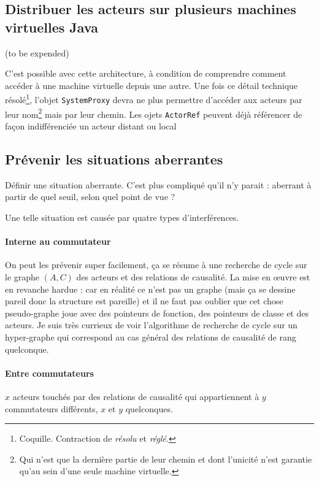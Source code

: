 \documentclass[11pt]{article}
\begin{document}
\subsection{Distribuer les acteurs sur plusieurs machines virtuelles Java}

(to be expended)

C'est possible avec cette architecture, à condition de comprendre comment accéder à une machine virtuelle depuis une autre. Une fois ce détail technique résolé\footnote{Coquille. Contraction de \textsl{résolu} et \textsl{réglé}.}, l'objet \texttt{SystemProxy} devra ne plus permettre d'accéder aux acteurs par leur nom\footnote{Qui n'est que la dernière partie de leur chemin et dont l'unicité n'est garantie qu'au sein d'une seule machine virtuelle.} mais par leur chemin. Les ojets \texttt{ActorRef} peuvent déjà référencer de façon indifférenciée un acteur distant ou local

\subsection{Prévenir les situations aberrantes}

Définir une situation aberrante. C'est plus compliqué qu'il n'y parait : aberrant à partir de quel seuil, selon quel point de vue ?

Une telle situation est causée par quatre types d'interférences.

\paragraph{Interne au commutateur} On peut les prévenir super facilement, ça se résume à une recherche de cycle sur le graphe $(A, C)$ des acteurs et des relations de causalité. La mise en œuvre est en revanche hardue : car en réalité ce n'est pas un graphe (mais ça se dessine pareil donc la structure est pareille) et il ne faut pas oublier que cet chose pseudo-graphe joue avec des pointeurs de fonction, des pointeurs de classe et des acteurs. Je suis très currieux de voir l'algorithme de recherche de cycle sur un hyper-graphe qui correspond au cas général des relations de causalité de rang quelconque.

\paragraph{Entre commutateurs} $x$ acteurs touchés par des relations de causalité qui appartiennent à $y$ commutateurs différents, $x$ et $y$ quelconques.
\end{document}
